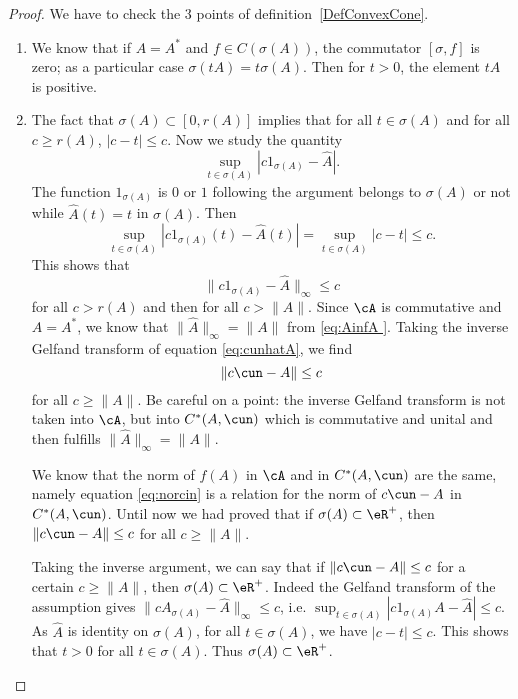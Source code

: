 \begin{proof}

    We have to check the \(3\) points of definition~\ref{DefConvexCone}.
    \begin{enumerate}
            \item

                We know that if $A=A^*$ and $f\in C(\sigma(A))$, the commutator $[\sigma,f]$ is zero; as a particular case $\sigma(tA)=t\sigma(A)$. Then for $t>0$, the element $tA$ is positive.

            \item

                The fact that $\sigma(A)\subset [0,r(A)]$ implies that for all $t\in\sigma(A)$ and for all $c\geq r(A)$,  $| c-t |\leq c$. Now we study the quantity
                \[
                  \sup_{t\in \sigma(A)}| c1_{\sigma(A)}-\hat A |.
                \]
                The function $1_{\sigma(A)}$ is $0$ or $1$ following the argument belongs to $\sigma(A)$ or not while $\hat A(t)=t$ in $\sigma(A)$. Then
                \[
                  \sup_{t\in\sigma(A)}| c1_{\sigma(A)}(t)-\hat A(t) |=\sup_{t\in\sigma(A)}| c-t |\leq c.
                \]
                This shows that
                \begin{equation} \label{eq:cunhatA}
                    \| c1_{\sigma(A)}-\hat A \|_{\infty}\leq c
                \end{equation}
                for all $c>r(A)$ and then for all $c>\| A \|$. Since $\cA$ is commutative and $A=A^*$, we know that $\| \hat A \|_{\infty}=\| A \|$ from  \eqref{eq:AinfA }. Taking the inverse Gelfand transform of equation \eqref{eq:cunhatA}, we find
                \begin{equation} \label{eq:norcin}
                    \| c\cun-A \|\leq c
                \end{equation}
                for all $c\geq\| A \|$. Be careful on a point: the inverse Gelfand transform is not taken into $\cA$, but into $C^*(A,\cun)$ which is commutative and unital and then fulfills $\| \hat A \|_{\infty}=\| A \|$.

                We know that the norm of $f(A)$ in $\cA$ and in $C^*(A,\cun)$ are the same, namely equation \eqref{eq:norcin} is a relation for the norm of $c\cun-A$ in $C^*(A,\cun)$. Until now we had proved that if $\sigma(A)\subset\eR^+$, then $\| c\cun-A \|\leq c$ for all $c\geq\| A \|$.

                Taking the inverse argument, we can say that if $\| c\cun-A \|\leq c$ for a certain $c\geq\| A \|$, then $\sigma(A)\subset\eR^+$. Indeed the Gelfand transform of the assumption gives $\| cA_{\sigma(A)}-\hat A \|_{\infty}\leq c$, i.e. $\sup_{t\in\sigma(A)}| c1_{\sigma(A)}A-\hat A |\leq c$. As $\hat A$ is identity on $\sigma(A)$, for all $t\in\sigma(A)$, we have $| c-t |\leq c$. This shows that $t>0$ for all $t\in\sigma(A)$. Thus $\sigma(A)\subset\eR^+$.


\end{enumerate}
\end{proof}
